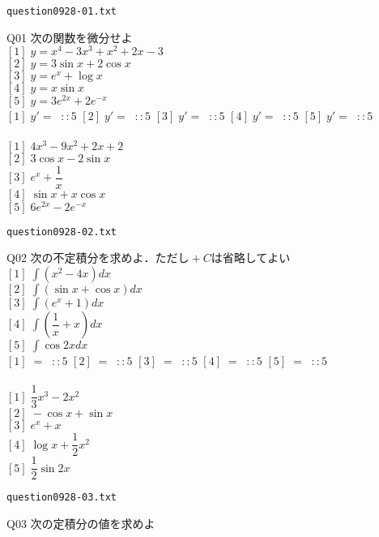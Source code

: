 \documentclass[11pt,dvipdfmx]{ujarticle}
\begin{document}
\begin{center}
\verb|question0928-01.txt|\\
\end{center}
Q01 
$\text{次の関数を微分せよ}$\\
$[1]\;y=x^4-3x^3+x^2+2x-3$\\
$[2]\;y=3\sin x +2\cos x $\\
$[3]\;y=e^{x}+\log x $\\
$[4]\;y=x\sin x $\\
$[5]\;y=3e^{2x}+2e^{-x}$\\
$[1]\;y'=\;\;::5$ 
$[2]\;y'=\;\;::5$ 
$[3]\;y'=\;\;::5$ 
$[4]\;y'=\;\;::5$ 
$[5]\;y'=\;\;::5$ 
\\
\\
$[1]\;4x^3-9x^2+2x+2$\\
$[2]\;3\cos x -2\sin x $\\
$[3]\;e^x+\dfrac{1}{x}$\\
$[4]\;\sin x +x\cos x $\\
$[5]\;6e^{2x}-2e^{-x}$\\
\newpage
\begin{center}
\verb|question0928-02.txt|\\
\end{center}
Q02 
$\text{次の不定積分を求めよ．ただし}+C\text{は省略してよい}$\\
$[1]\;\displaystyle\int (x^2-4x) dx $\\
$[2]\;\displaystyle\int (\sin x +\cos x ) dx $\\
$[3]\;\displaystyle\int (e^x+1) dx $\\
$[4]\;\displaystyle\int (\dfrac{1}{x}+x) dx $\\
$[5]\;\displaystyle\int \cos 2x  dx $\\
$[1]\;=\;\;::5$ 
$[2]\;=\;\;::5$ 
$[3]\;=\;\;::5$ 
$[4]\;=\;\;::5$ 
$[5]\;=\;\;::5$ 
\\
\\
$[1]\;\dfrac{1}{3}x^3-2x^2$\\
$[2]\;-\cos x +\sin x $\\
$[3]\;e^x+x$\\
$[4]\;\log x +\dfrac{1}{2}x^2$\\
$[5]\;\dfrac{1}{2}\sin 2x $\\
\newpage
\begin{center}
\verb|question0928-03.txt|\\
\end{center}
Q03 
$\text{次の定積分の値を求めよ}$\\
\end{document}
